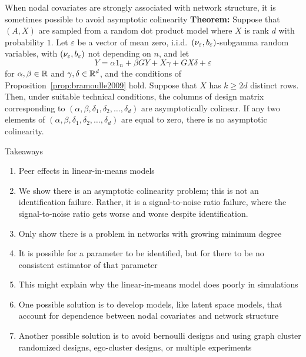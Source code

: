 \documentclass[final]{beamer}
\newlength{\colwidth}
\begin{document}
\begin{frame}[t]
\begin{columns}[t]
\begin{column}{\colwidth}
\begin{block}{When nodal covariates are strongly associated with network structure, it is sometimes possible to avoid asymptotic colinearity}
                \textbf{Theorem:} Suppose that $(A, X)$ are sampled from a random dot product model where $X$ is rank $d$ with probability $1$. Let $\varepsilon$ be a vector of mean zero, i.i.d.~$(\nu_\varepsilon,b_\varepsilon)$-subgamma random variables, with $(\nu_\varepsilon,b_\varepsilon)$ not depending on $n$, and let
                \begin{equation*}
                    Y = \alpha 1_n + \beta G Y + X \gamma + G X \delta + \varepsilon
                \end{equation*}
                for $\alpha, \beta \in \mathbb{R}$ and $\gamma, \delta \in \mathbb{R}^d$, and the conditions of Proposition~\ref{prop:bramoulle2009} hold. Suppose that $X$ has $k \ge 2d$ distinct rows. Then, under suitable technical conditions, the columns of design matrix corresponding to $(\alpha, \beta, \delta_1, \delta_2, \dots, \delta_d)$ are asymptotically colinear. If any two elements of $(\alpha, \beta, \delta_1, \delta_2, \dots, \delta_d)$ are equal to zero, there is no asymptotic colinearity.
            \end{block}


            \begin{block}{Takeaways}
                \begin{enumerate}
                    \item Peer effects in linear-in-means models
                    \item We show there is an asymptotic colinearity problem; this is not an identification failure. Rather, it is a signal-to-noise ratio failure, where the signal-to-noise ratio gets worse and worse despite identification.
                    \item Only show there is a problem in networks with growing minimum degree
                    \item It is possible for a parameter to be identified, but for there to be no consistent estimator of that parameter
                    \item This might explain why the linear-in-means model does poorly in simulations
                    \item One possible solution is to develop models, like latent space models, that account for dependence between nodal covariates and network structure
                    \item Another possible solution is to avoid bernoulli designs and using graph cluster randomized designs, ego-cluster designs, or multiple experiments
                \end{enumerate}
            \end{block}



\end{column}
\end{columns}
\end{frame}
\end{document}
